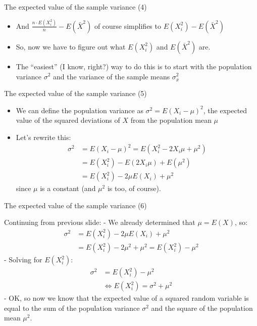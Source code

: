 \begin{frame}{The expected value of the sample variance (4)}

\begin{itemize}
\itemsep1pt\parskip0pt
\item
  And \(\frac{n\cdot E(X_i^2)}{n}-E(\bar{X}^2)\) of course simplifies to
  \(E(X_i^2)-E(\bar{X}^2)\)
\item
  So, now we have to figure out what \(E(X_i^2)\) and \(E(\bar{X}^2)\)
  are.
\item
  The ``easiest'' (I know, right?) way to do this is to start with the
  population variance \(\sigma^2\) and the variance of the sample means
  \(\sigma_{\bar{x}}^2\)
\end{itemize}

\end{frame}

\begin{frame}{The expected value of the sample variance (5)}

\begin{itemize}
\itemsep1pt\parskip0pt
\item
  We can define the population variance as
  \(\sigma^2 = E(X_i - \mu)^2\), the expected value of the squared
  deviations of \(X\) from the population mean \(\mu\)
\item
  Let's rewrite this: \[
  \begin{aligned}
  \sigma^2 &= E(X_i - \mu)^2 = E(X_i^2 - 2X_i\mu + \mu^2) \\
       &= E(X_i^2) - E(2X_i\mu) + E(\mu^2)\\
       &= E(X_i^2) - 2\mu E(X_i) + \mu^2
  \end{aligned}
  \] since \(\mu\) is a constant (and \(\mu^2\) is too, of course).
\end{itemize}

\end{frame}

\begin{frame}{The expected value of the sample variance (6)}

Continuing from previous slide: - We already determined that
\(\mu = E(X)\), so: \[
\begin{aligned}
\sigma^2 &= E(X_i^2) - 2\mu E(X_i) + \mu^2 \\
         &= E(X_i^2) - 2\mu^2 + \mu^2 = E(X_i^2) - \mu^2 
\end{aligned}
\] - Solving for \(E(X_i^2)\): \[\begin{aligned}
\sigma^2 &= E(X_i^2) - \mu^2  \\
&\Leftrightarrow E(X_i^2) = \sigma^2 + \mu^2
\end{aligned}
\] - OK, so now we know that the expected value of a squared random
variable is equal to the sum of the population variance \(\sigma^2\) and
the square of the population mean \(\mu^2\).

\end{frame}

